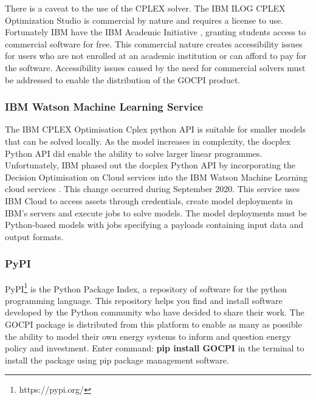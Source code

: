 \documentclass[12pt]{article}
\begin{document}
There is a caveat to the use of the CPLEX solver. The IBM ILOG CPLEX Optimization Studio is commercial by nature and requires a license to use.
Fortunately IBM have the IBM Academic Initiative \cite{IBM_AI}, granting students access to commercial software for free.
This commercial nature creates accessibility issues for users who are not enrolled at an academic institution or can afford to pay for the software.
Accessibility issues caused by the need for commercial solvers must be addressed to enable the distribution of the GOCPI product.

\subsubsection{IBM Watson Machine Learning Service}
The IBM CPLEX Optimisation Cplex python API is suitable for smaller models that can be solved locally.
As the model increases in complexity, the docplex Python API did enable the ability to solve larger linear programmes.
Unfortunately, IBM phased out the docplex Python API by incorporating the Decision Optimisation on Cloud services into the IBM Watson Machine Learning cloud services \cite{IBM_WML}.
This change occurred during September 2020.
This service uses IBM Cloud to access assets through credentials, create model deployments in IBM's servers and execute jobs to solve models.
The model deployments must be Python-based models with jobs specifying a payloads containing input data and output formats.

\subsubsection{PyPI}\label{PyPI}
PyPI\footnote{https://pypi.org/} is the Python Package Index, a repository of software for the python programming language.
This repository helps you find and install software developed by the Python community who have decided to share their work.
The GOCPI package is distributed from this platform to enable as many as possible the ability to model their own energy systems to inform and question energy policy and investment.
Enter command: \textbf{pip install GOCPI} in the terminal to install the package using pip package management software.
\end{document}
